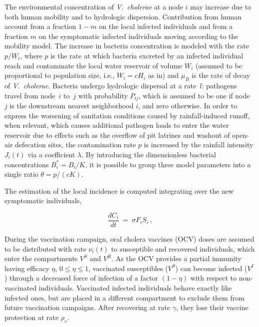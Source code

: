 The environmental concentration of \textit{V.~cholerae} at a node $i$ may increase due to both human mobility and to hydrologic dispersion. Contribution from human account from a fraction $1-m$ on the local infected individuals and from a fraction $m$ on the symptomatic infected individuals moving according to the mobility model. The increase in bacteria concentration is modeled with the rate~$p/W_i$, where $p$ is the rate at which bacteria excreted by an infected individual reach and contaminate the local water reservoir of volume $W_i$ (assumed to be proportional to population size, i.e., $W_i=c H_i$ as in\textcite{Rinaldo:Reassessment20102011:2012}) and $\mu_B$ is the rate of decay of \textit{V.~cholerae}. Bacteria undergo hydrologic dispersal at a rate~$l$: pathogens travel from node~$i$ to~$j$ with probability $P_{ij}$, which is assumed to be one if node~$j$ is the downstream nearest neighborhood $i$, and zero otherwise. In order to express the worsening of sanitation conditions caused by rainfall-induced runoff, when relevant, which causes additional pathogen loads to enter the water reservoir due to effects such as the overflow of pit latrines and washout of open-air defecation sites\cite{Gaudart:SpatioTemporalDynamicsCholera:2013}, the contamination rate $p$ is increased by the rainfall intensity $J_i(t)$ via a coefficient $\lambda$\cite{Rinaldo:Reassessment20102011:2012,Righetto:RainfallMediationsSpreading:2013}. By introducing the dimensionless bacterial concentrations $B_i^*=B_i/K$,  it is possible to group three model parameters into a single ratio $\theta=p/(cK)$\cite{Bertuzzo:SpacetimeEvolutionCholera:2008}.

The estimation of the local incidence is computed integrating over the new symptomatic individuals,

\begin{equation}
\frac{d C_i}{dt} \ = \ \sigma F_i S_i  \, , \label{eq:C}
\end{equation}

During the vaccination campaign, oral cholera vaccines (OCV)  doses are assumed to be distributed with rate $\nu_i(t)$ to susceptible and recovered individuals, which enter the compartments $V^S$ and $V^R$. As the OCV provides a partial immunity having efficacy $\eta$, $0\leq \eta \leq 1$, vaccinated susceptibles ($V^S$) can become infected ($V^I$) through a decreased force of infection of a factor $(1-\eta)$ with respect to non-vaccinated individuals. Vaccinated infected individuals behave exactly like infected ones, but are placed in a different compartment to exclude them from future vaccination campaigns. After recovering at  rate $\gamma$, they lose their vaccine protection at rate $\rho_{v}$.


